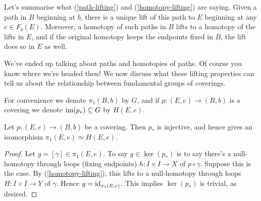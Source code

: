 \begin{remark}
  Let's summarise what (\ref{path-lifting}) and
  (\ref{homotopy-lifting}) are saying. Given a path in $B$ beginning
  at $b$, there is a unique lift of this path to $E$ beginning at any
  $e \in F_b(E)$. Moreover, a homotopy of such paths in $B$ lifts to a
  homotopy of the lifts in $E$, and if the original homotopy keeps the
  endpoints fixed in $B$, the lift does so in $E$ as well.
\end{remark}

We've ended up talking about paths and homotopies of paths. Of course
you know where we're headed then! We now discuss what these lifting
properties can tell us about the relationship between fundamental
groups of coverings.

\begin{notation}
  For convenience we denote $\pi_1(B,b)$ by $G$, and if $p : (E,e) \to
  (B,b)$ is a covering we denote $\operatorname{im}(p_*) \subseteq G$ by $H(E,e)$.
\end{notation}

\begin{proposition}
  \label{cover-inj}
  Let $p : (E,e) \to (B,b)$ be a covering. Then $p_*$ is injective,
  and hence gives an isomorphism $\pi_1(E,e) \simeq H(E,e)$.
\end{proposition}

\begin{proof}
  Let $g = [\gamma] \in \pi_1(E,e)$. To say $g \in \ker(p_*)$ is to
  say there's a null-homotopy through loops (fixing endpoints) $h : I
  \times I \to X$ of $p \circ \gamma$. Suppose this is the case. By
  (\ref{homotopy-lifting}), this lifts to a null-homotopy through
  loops $H : I \times I \to Y$ of $\gamma$. Hence $g =
  \mathrm{id}_{\pi_1(E,e)}$. This implies $\ker(p_*)$ is trivial, as desired.
\end{proof}


